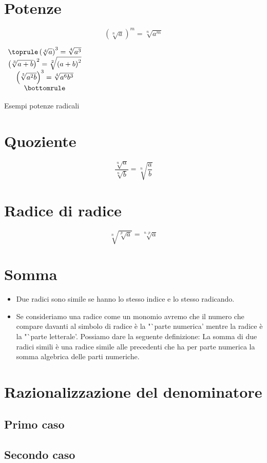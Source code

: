\section{Potenze}
\label{sec:PotenzeRadici}
\[\left( \sqrt[n]{a}\right)^m=\sqrt[n]{a^m}\]
\begin{table}[H]
\centering
$
\begin{array}{cc}
\toprule
\left( \sqrt[4]{a}\right)^3=\sqrt[4]{a^3} \\ 
\left( \sqrt[3]{a+b}\right)^2=\sqrt[2]{\left( a+b\right)^2 } \\ 
\left( \sqrt[5]{a^2b}\right)^3=\sqrt[4]{a^6b^3} \\ 
\bottomrule 
\end{array}
$ 
\label{tab:potenzeradici1}
\caption{Esempi potenze radicali}
\end{table}
\section{Quoziente} 
\label{sec:quozienteradicali}
\[\dfrac{\sqrt[n]{a}}{\sqrt[n]{b}}=\sqrt[n]{\dfrac{a}{b}}\]
\section{Radice di radice}
\label{sec:radicediradice}
\[\sqrt[n]{\sqrt[p]{a}}=\sqrt[n\cdot p]{a}\]
\section{Somma}
\label{sec:SommaReali}
\begin{itemize}
\item Due radici sono simile se hanno lo stesso indice e  lo stesso radicando.
\item Se consideriamo una radice come un monomio avremo che il numero che compare davanti al simbolo di radice è la "`parte numerica' mentre la radice è la "`parte letterale'. Possiamo dare la seguente definizione: La somma di due radici simili è una radice simile alle precedenti che ha per parte numerica la somma algebrica delle parti numeriche.
\end{itemize}
\section{Razionalizzazione del denominatore}
\label{sec:razzionalizzazionedenominatoreradici}
\subsection{Primo caso}
\label{sec:razionzinalizzadioneden1caso}
\subsection{Secondo caso}
\label{sec:razionzinalizzadioneden2caso}


